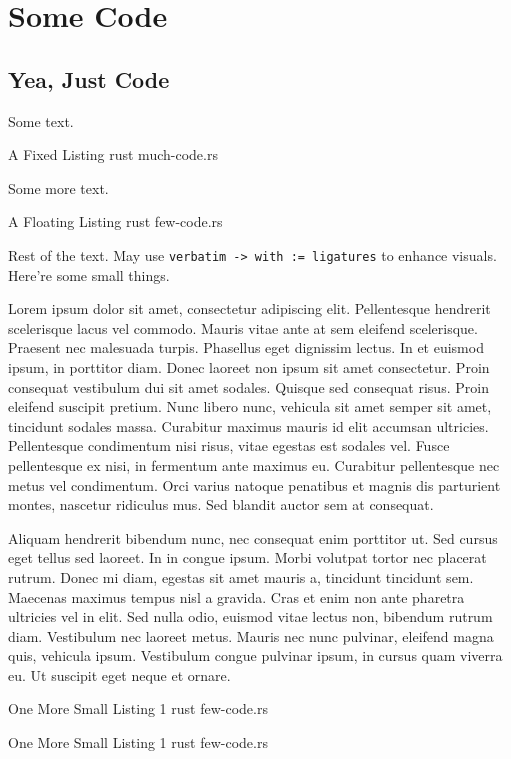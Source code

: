 \chapter{Some Code}
\section{Yea, Just Code}

Some text.

\fixedlisting
    {A Fixed Listing}
    {rust}
    {much-code.rs}

Some more text.

\floatinglisting
    {A Floating Listing}
    {rust}
    {few-code.rs}
    
Rest of the text. May use \verb+verbatim -> with := ligatures+ to enhance visuals. Here're some small things.

Lorem ipsum dolor sit amet, consectetur adipiscing elit. Pellentesque hendrerit scelerisque lacus vel commodo. Mauris vitae ante at sem eleifend scelerisque. Praesent nec malesuada turpis. Phasellus eget dignissim lectus. In et euismod ipsum, in porttitor diam. Donec laoreet non ipsum sit amet consectetur. Proin consequat vestibulum dui sit amet sodales. Quisque sed consequat risus. Proin eleifend suscipit pretium. Nunc libero nunc, vehicula sit amet semper sit amet, tincidunt sodales massa. Curabitur maximus mauris id elit accumsan ultricies. Pellentesque condimentum nisi risus, vitae egestas est sodales vel. Fusce pellentesque ex nisi, in fermentum ante maximus eu. Curabitur pellentesque nec metus vel condimentum. Orci varius natoque penatibus et magnis dis parturient montes, nascetur ridiculus mus. Sed blandit auctor sem at consequat.

Aliquam hendrerit bibendum nunc, nec consequat enim porttitor ut. Sed cursus eget tellus sed laoreet. In in congue ipsum. Morbi volutpat tortor nec placerat rutrum. Donec mi diam, egestas sit amet mauris a, tincidunt tincidunt sem. Maecenas maximus tempus nisl a gravida. Cras et enim non ante pharetra ultricies vel in elit. Sed nulla odio, euismod vitae lectus non, bibendum rutrum diam. Vestibulum nec laoreet metus. Mauris nec nunc pulvinar, eleifend magna quis, vehicula ipsum. Vestibulum congue pulvinar ipsum, in cursus quam viverra eu. Ut suscipit eget neque et ornare.

\fixedlisting
    {One More Small Listing 1}
    {rust}
    {few-code.rs}

\fixedlisting
    {One More Small Listing 1}
    {rust}
    {few-code.rs}
